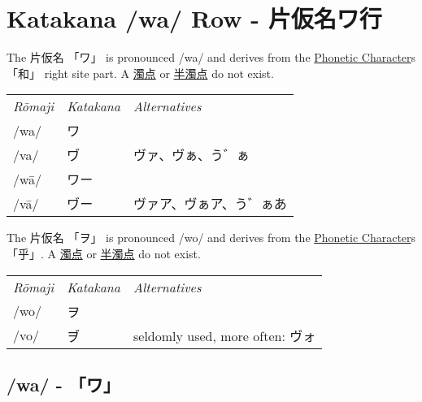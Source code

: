 \section{Katakana /wa/ Row - 片仮名ワ行}\label{sec:KatakanaWaRow}


\label{letter:wa} The 片仮名 {「ワ」} is pronounced  /wa/ and
derives from the \hyperref[sec:PhoneticCharacter]{Phonetic Character}s {「和」}
right site part.  A \hyperref[sec:Dakuten]{濁点}  or
\hyperref[sec:Handakuten]{半濁点} do not exist.


\begin{center}\begin{tabular}{lll}
\textit{Rōmaji}&\textit{Katakana}&\textit{Alternatives}\\
/wa/&ワ  &\\
/va/&ヷ  &\small ヴァ、ヴぁ、う゛ぁ\\
/wā/&ワー&\\
/vā/&ヷー&\small ヴァア、ヴぁア、う゛ぁあ\\
\end{tabular}\end{center}


\label{letter:wo} The 片仮名 {「ヲ」} is pronounced  /wo/ and
derives from the \hyperref[sec:PhoneticCharacter]{Phonetic Character}s {「乎」}.
A \hyperref[sec:Dakuten]{濁点}  or \hyperref[sec:Handakuten]{半濁点} do not
exist.

\begin{center}\begin{tabular}{lll}
\textit{Rōmaji}&\textit{Katakana}&\textit{Alternatives}\\
/wo/&ヲ  &\\
/vo/&ヺ  &seldomly used, more often: ヴォ\\
\end{tabular}\end{center}


\newpage


\newpage

\subsection{/wa/ - 「ワ」}\label{sec:KatakanaWa}

